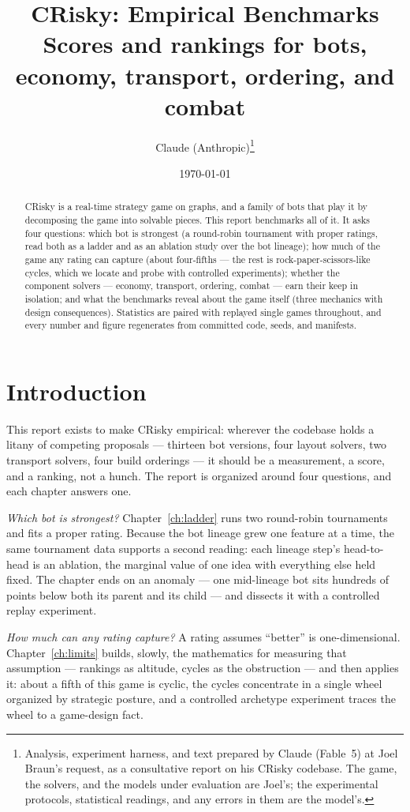 \documentclass[11pt]{report}
\title{CRisky: Empirical Benchmarks\\
  \large Scores and rankings for bots, economy, transport, ordering, and combat}
\author{Claude (Anthropic)\thanks{Analysis, experiment harness, and text
  prepared by Claude (Fable~5) at Joel Braun's request, as a consultative
  report on his CRisky codebase. The game, the solvers, and the models under
  evaluation are Joel's; the experimental protocols, statistical readings, and
  any errors in them are the model's.}}
\date{\today}
\begin{document}
\maketitle

\begin{abstract}
CRisky is a real-time strategy game on graphs, and a family of bots that play
it by decomposing the game into solvable pieces. This report benchmarks all
of it. It asks four questions: which bot is strongest (a round-robin
tournament with proper ratings, read both as a ladder and as an ablation
study over the bot lineage); how much of the game any rating can capture
(about four-fifths --- the rest is rock-paper-scissors-like cycles, which we
locate and probe with controlled experiments); whether the component solvers
--- economy, transport, ordering, combat --- earn their keep in isolation;
and what the benchmarks reveal about the game itself (three mechanics with
design consequences). Statistics are paired with replayed single games
throughout, and every number and figure regenerates from committed code,
seeds, and manifests.
\end{abstract}

\tableofcontents

\chapter{Introduction}
\label{ch:intro}

This report exists to make CRisky empirical: wherever the codebase holds a
litany of competing proposals --- thirteen bot versions, four layout
solvers, two transport solvers, four build orderings --- it should be a
measurement, a score, and a ranking, not a hunch. The report is organized
around four questions, and each chapter answers one.

\emph{Which bot is strongest?} Chapter~\ref{ch:ladder} runs two round-robin
tournaments and fits a proper rating. Because the bot lineage grew one
feature at a time, the same tournament data supports a second reading:
each lineage step's head-to-head is an ablation, the marginal value of one
idea with everything else held fixed. The chapter ends on an anomaly ---
one mid-lineage bot sits hundreds of points below both its parent and its
child --- and dissects it with a controlled replay experiment.

\emph{How much can any rating capture?} A rating assumes ``better'' is
one-dimensional. Chapter~\ref{ch:limits} builds, slowly, the mathematics
for measuring that assumption --- rankings as altitude, cycles as the
obstruction --- and then applies it: about a fifth of this game is cyclic,
the cycles concentrate in a single wheel organized by strategic posture,
and a controlled archetype experiment traces the wheel to a game-design
fact.
\end{document}
